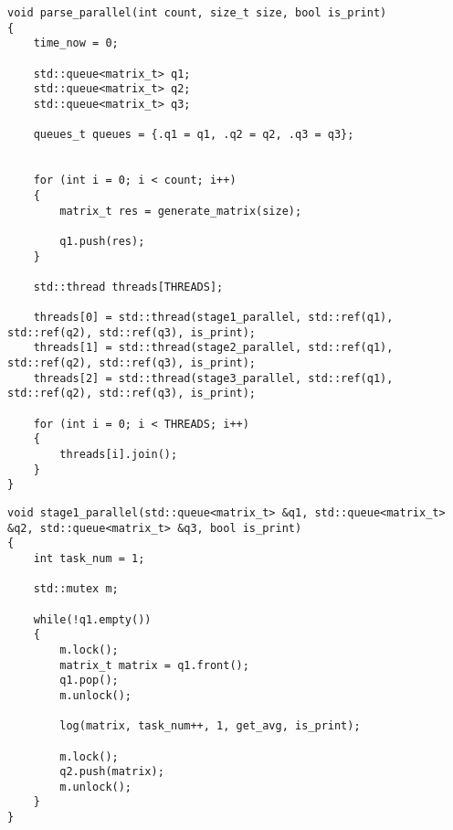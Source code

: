 \clearpage

\begin{center}
    \captionsetup{justification=raggedright,singlelinecheck=off}
    \begin{lstlisting}[label=lst:par_alg,caption=Алгоритм конвейерной обработки матрицы]
void parse_parallel(int count, size_t size, bool is_print)
{
	time_now = 0;

	std::queue<matrix_t> q1;
	std::queue<matrix_t> q2;
	std::queue<matrix_t> q3;

	queues_t queues = {.q1 = q1, .q2 = q2, .q3 = q3};

	
	for (int i = 0; i < count; i++)
	{
		matrix_t res = generate_matrix(size);
		
		q1.push(res);
	}

	std::thread threads[THREADS];

	threads[0] = std::thread(stage1_parallel, std::ref(q1), std::ref(q2), std::ref(q3), is_print);
	threads[1] = std::thread(stage2_parallel, std::ref(q1), std::ref(q2), std::ref(q3), is_print);
	threads[2] = std::thread(stage3_parallel, std::ref(q1), std::ref(q2), std::ref(q3), is_print);

	for (int i = 0; i < THREADS; i++)
	{
		threads[i].join();
	}
}
\end{lstlisting}
\end{center}


\clearpage


\begin{center}
    \captionsetup{justification=raggedright,singlelinecheck=off}
    \begin{lstlisting}[label=lst:no_par_alg,caption=Алгоритм запуска 1 потока для нахождения среднего арифметического элементов матрицы]
void stage1_parallel(std::queue<matrix_t> &q1, std::queue<matrix_t> &q2, std::queue<matrix_t> &q3, bool is_print)
{
	int task_num = 1;

	std::mutex m;

	while(!q1.empty())
	{      
		m.lock();
		matrix_t matrix = q1.front();
		q1.pop();
		m.unlock();

		log(matrix, task_num++, 1, get_avg, is_print);

		m.lock();
		q2.push(matrix);
		m.unlock();
	}
}
\end{lstlisting}
\end{center}

\clearpage

